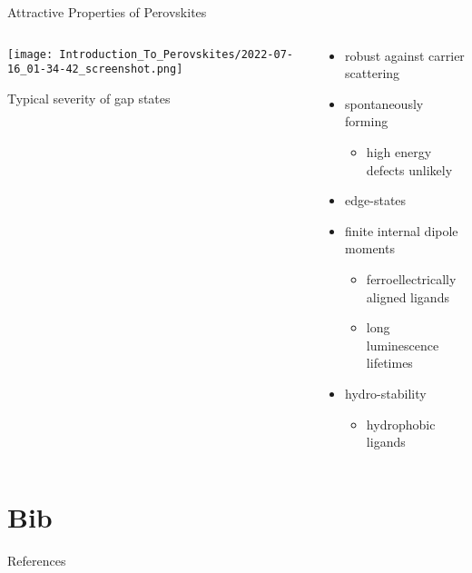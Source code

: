 \documentclass[10pt, compress, aspectratio=169]{beamer}
\begin{document}
\begin{frame}[label={sec:org21597d7}]{Attractive Properties of Perovskites}
\begin{columns}
\begin{column}{0.5\columnwidth}
\begin{center}
\texttt{[image: Introduction\_To\_Perovskites/2022-07-16\_01-34-42\_screenshot.png]}
\end{center}
Typical severity of gap states
\autocite{mannodi-kanakkithodi-2020-defec-energ}
\end{column}
\begin{column}{0.5\columnwidth}
\begin{itemize}
\item robust against carrier scattering
\autocite{yan-2016-defec-physic}
\item spontaneously forming
\begin{itemize}
\item high energy defects unlikely
\end{itemize}
\item edge-states
\item finite internal dipole moments
\autocite{hong-2021-layer-edge}
\begin{itemize}
\item ferroellectrically aligned ligands
\item long luminescence lifetimes
\end{itemize}
\item hydro-stability
\autocite{fu-2021-two-dimen}
\begin{itemize}
\item hydrophobic ligands
\end{itemize}
\end{itemize}
\end{column}
\end{columns}
\end{frame}

\section{Bib}
\label{sec:orgcacb5ff}
\begin{frame}[label={sec:orge63e173}]{References}
\AtNextBibliography{\tiny}
\printbibliography
\end{frame}
\end{document}
